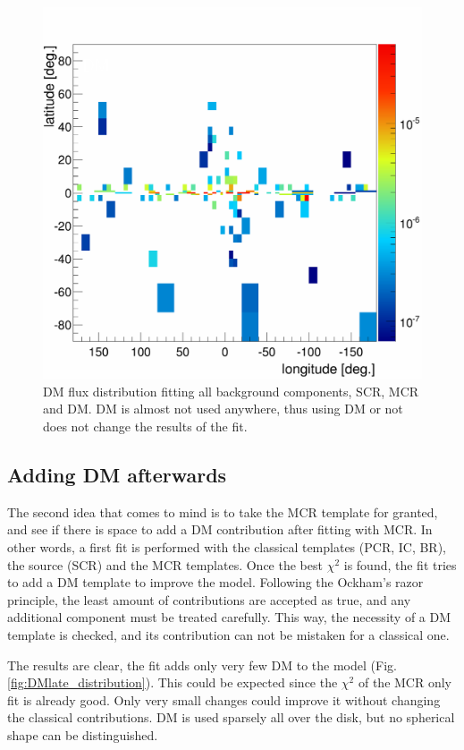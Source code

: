\begin{figure}
	\centering
	\includegraphics[width=.5\linewidth]{pic/discussion/DM+MCR_DM_distribution.png}
	\caption[DM distribution for a fit using DM and MCR]{DM flux distribution fitting all background components, SCR, MCR and DM. DM is almost not used anywhere, thus using DM or not does not change the results of the fit.}
	\label{fig:DM+MCR_distribution}
\end{figure}

\subsection{Adding DM afterwards}

The second idea that comes to mind is to take the MCR template for granted, and see if there is space to add a DM contribution after fitting with MCR. In other words, a first fit is performed with the classical templates (PCR, IC, BR), the source (SCR) and the MCR templates. Once the best $\chi^2$ is found, the fit tries to add a DM template to improve the model.
Following the Ockham's razor principle, the least amount of contributions are accepted as true, and any additional component must be treated carefully. This way, the necessity of a DM template is checked, and its contribution can not be mistaken for a classical one.

The results are clear, the fit adds only very few DM to the model (Fig. \ref{fig:DMlate_distribution}). This could be expected since the $\chi^2$ of the MCR only fit is already good. Only very small changes could improve it without changing the classical contributions. DM is used sparsely all over the disk, but no spherical shape can be distinguished. 


